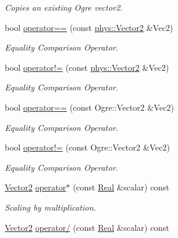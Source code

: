 \begin{DoxyCompactItemize}
\begin{DoxyCompactList}\small\item\em Copies an existing Ogre vector2. \item\end{DoxyCompactList}\item 
bool \hyperlink{classphys_1_1Vector2_a89874b6def8107146ca7079a2de49360}{operator==} (const \hyperlink{classphys_1_1Vector2}{phys::Vector2} \&Vec2)
\begin{DoxyCompactList}\small\item\em Equality Comparison Operator. \item\end{DoxyCompactList}\item 
bool \hyperlink{classphys_1_1Vector2_a074ca2a4d54925f745dbb9effd5c7e19}{operator!=} (const \hyperlink{classphys_1_1Vector2}{phys::Vector2} \&Vec2)
\begin{DoxyCompactList}\small\item\em Equality Comparison Operator. \item\end{DoxyCompactList}\item 
bool \hyperlink{classphys_1_1Vector2_a2fe433e9401748547b19cc5be891ed52}{operator==} (const Ogre::Vector2 \&Vec2)
\begin{DoxyCompactList}\small\item\em Equality Comparison Operator. \item\end{DoxyCompactList}\item 
bool \hyperlink{classphys_1_1Vector2_a186c1da597e1471a9ee5b07cc8bb9fb8}{operator!=} (const Ogre::Vector2 \&Vec2)
\begin{DoxyCompactList}\small\item\em Equality Comparison Operator. \item\end{DoxyCompactList}\item 
\hyperlink{classphys_1_1Vector2}{Vector2} \hyperlink{classphys_1_1Vector2_a59fa4aaadcccd04bf6de8fcd84b31c6d}{operator$\ast$} (const \hyperlink{namespacephys_af7eb897198d265b8e868f45240230d5f}{Real} \&scalar) const 
\begin{DoxyCompactList}\small\item\em Scaling by multiplication. \item\end{DoxyCompactList}\item 
\hyperlink{classphys_1_1Vector2}{Vector2} \hyperlink{classphys_1_1Vector2_a51f7d8ce03f7ab05137b277532edf93b}{operator/} (const \hyperlink{namespacephys_af7eb897198d265b8e868f45240230d5f}{Real} \&scalar) const 

\end{DoxyCompactItemize}
